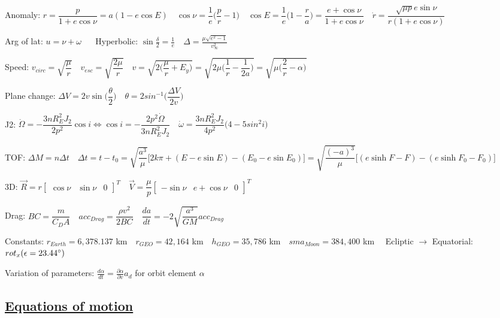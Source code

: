 \documentclass[11pt,landscape]{article}
\begin{document}
Anomaly:
$
r = \dfrac{p}{1+e\cos\nu} = a(1-e\cos E)
\quad
\cos\nu = \dfrac{1}{e} \big( \dfrac{p}{r}-1 \big)
\quad
\cos E = \dfrac{1}{e} \big( 1- \dfrac{r}{a} \big)
= \dfrac{e+\cos\nu}{1+e\cos\nu}
\quad
\dot{r} = \dfrac{\sqrt{\mu p} e \sin\nu}{r(1+e\cos\nu)}
\quad$

Arg of lat: $u = \nu + \omega$
$\quad$
Hyperbolic:
$
\sin \frac{\delta}{2} = \frac{1}{e}
\quad
\Delta = \frac{\mu \sqrt{e^2 - 1}}{v_{\infty}^2}
$

Speed:
$
v_{circ}=\sqrt{\dfrac{\mu}{r}}
\quad
v_{esc}=\sqrt{\dfrac{2\mu}{r}}
\quad
v
= \sqrt{2 \big( \dfrac{\mu}{r} + E_y \big) }
= \sqrt{2\mu \big( \dfrac{1}{r} - \dfrac{1}{2a} \big) }
= \sqrt{\mu \big( \dfrac{2}{r} - \alpha \big) }
$

Plane change:
$
\Delta V = 2 v \sin \big( \dfrac{\theta}{2} \big)
\quad
\theta = 2 sin^{-1} \big( \dfrac{\Delta V}{2v} \big)
$

J2:
$
\dot{\Omega} = - \dfrac{3 n R_E^2 J_2}{2 p^2} \cos i
\Leftrightarrow
\cos i = - \dfrac{2 p^2 \dot{\Omega}}{3 n R_E^2 J_2}
\quad
\dot{\omega} = \dfrac{3 n R_E^2 J_2}{4 p^2} \big( 4 - 5 sin^2 i \big)
$

TOF:
$
\Delta M = n \Delta t
\quad
\Delta t = t - t_0
= \sqrt{\dfrac{a^3}{\mu}} \big[ 2 k \pi + (E-e\sin E) - (E_0-e\sin E_0) \big]
= \sqrt{\dfrac{(-a)^3}{\mu}} \big[ (e\sinh F - F) - (e\sinh F_0 - F_0) \big]
$

3D:
$
\vec{R} = r \begin{bmatrix} \cos\nu & \sin\nu & 0 \end{bmatrix}^T
\quad
\vec{V} = \dfrac{\mu}{p} \begin{bmatrix} -\sin\nu & e+\cos\nu & 0 \end{bmatrix}^T
$

Drag:
$
BC = \dfrac{m}{C_D A}
\quad
acc_{Drag} = \dfrac{\rho v^2}{2 BC}
\quad
\dfrac{da}{dt} = -2 \sqrt{\dfrac{a^3}{GM}} acc_{Drag}
$

Constants: 
$
r_{Earth} = 6,378.137 $ km$
\quad
r_{GEO} = 42,164 $ km$
\quad
h_{GEO} = 35,786 $ km$
\quad
sma_{Moon} = 384,400 $ km$
\quad
$
Ecliptic $\rightarrow$ Equatorial: $rot_x( \epsilon = 23.44\degree )$


Variation of parameters: 
$\frac{d\alpha}{dt} = \frac{\partial\alpha}{\partial v} a_d$
for orbit element $\alpha$


\newpage
\subsection{\underline{Equations of motion}}
\end{document}

